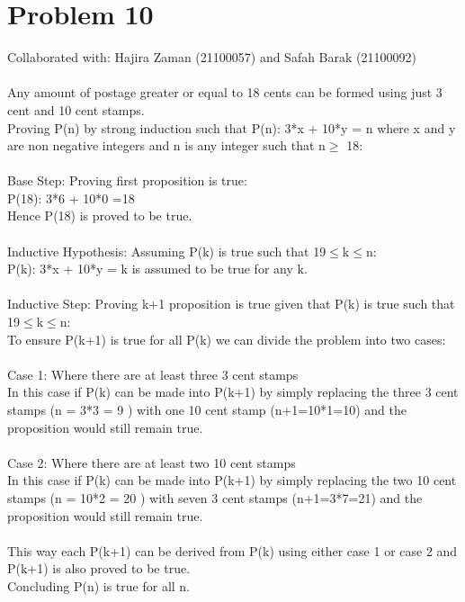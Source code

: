 \documentclass{article}
\begin{document}
\section{Problem 10}
Collaborated with:  Hajira Zaman (21100057) and Safah Barak (21100092)\\\\
Any amount of postage greater or equal to 18 cents can be formed using just 3 cent and 10 cent stamps.\\
Proving P(n) by strong induction such that P(n): 3*x + 10*y = n where x and y are non negative integers and n is any integer such that n$\geq$ 18: \\\\
Base Step: Proving first proposition is true:\\
P(18): 3*6 + 10*0 =18 \\
Hence P(18) is proved to be true. \\\\
Inductive Hypothesis: Assuming P(k) is true such that 19$\leq$k$\leq$n:\\
P(k): 3*x + 10*y = k is assumed to be true for any k.\\\\
Inductive Step: Proving  k+1 proposition is true given that P(k) is true such that 19$\leq$k$\leq$n:\\
To ensure P(k+1) is true for all P(k) we can divide the problem into two cases:\\\\
Case 1: Where there are at least three 3 cent stamps\\
In this case if P(k) can be made into P(k+1) by simply replacing the three 3 cent stamps (n = 3*3 = 9 ) with one 10 cent stamp (n+1=10*1=10) and the proposition would still remain true. \\\\
Case 2: Where there are at least two 10 cent stamps\\
In this case if P(k) can be made into P(k+1) by simply replacing the two 10 cent stamps (n = 10*2 = 20 ) with seven 3 cent stamps (n+1=3*7=21) and the proposition would still remain true. \\\\
This way each P(k+1) can be derived from P(k) using either case 1 or case 2 and P(k+1) is also proved to be true. \\
Concluding P(n) is true for all n.\\
\end{document}
